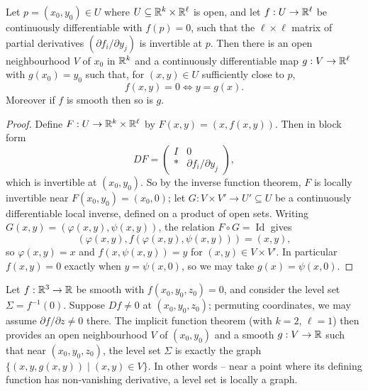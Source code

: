 \documentclass[a4paper]{scrartcl}
\begin{document}
\begin{theorem}
    Let $p = (x_0, y_0) \in U$ where $U \subseteq \mathbb{R}^k \times \mathbb{R}^\ell$ is open, and let $f: U \rightarrow \mathbb{R}^\ell$ be continuously differentiable with $f(p) = 0$, such that the $\ell \times \ell$ matrix of partial derivatives $\left(\partial f_i/\partial y_j\right)$ is invertible at $p$. Then there is an open neighbourhood $V$ of $x_0$ in $\mathbb{R}^k$ and a continuously differentiable map $g: V \rightarrow \mathbb{R}^\ell$ with $g(x_0) = y_0$ such that, for $(x, y) \in U$ sufficiently close to $p$,
    $$
    f(x, y) = 0 \iff y = g(x).
    $$
    Moreover if $f$ is smooth then so is $g$.
\end{theorem}
\begin{proof}
    Define $F: U \rightarrow \mathbb{R}^k \times \mathbb{R}^\ell$ by $F(x, y) = (x, f(x, y))$. Then in block form
    $$
    DF = \begin{pmatrix}
        I & 0 \\ * & \partial f_i/\partial y_j
    \end{pmatrix},
    $$
    which is invertible at $(x_0, y_0)$. So by the inverse function theorem, $F$ is locally invertible near $F(x_0, y_0) = (x_0, 0)$; let $G: V \times V' \rightarrow U' \subseteq U$ be a continuously differentiable local inverse, defined on a product of open sets. Writing $G(x, y) = (\varphi(x, y), \psi(x, y))$, the relation $F \circ G = \operatorname{Id}$ gives
    $$
    (\varphi(x, y), f(\varphi(x,y), \psi(x, y))) = (x, y),
    $$
    so $\varphi(x, y) = x$ and $f(x, \psi(x, y)) = y$ for $(x, y) \in V \times V'$.
    In particular $f(x, y) = 0$ exactly when $y = \psi(x, 0)$, so we may take $g(x) = \psi(x, 0)$.
\end{proof}

\begin{example}
    Let $f: \mathbb{R}^3 \rightarrow \mathbb{R}$ be smooth with $f(x_0, y_0, z_0) = 0$, and consider the level set $\Sigma = f^{-1}(0)$. Suppose $Df \neq 0$ at $(x_0, y_0, z_0)$; permuting coordinates, we may assume $\partial f/\partial z \neq 0$ there. The implicit function theorem (with $k = 2$, $\ell = 1$) then provides an open neighbourhood $V$ of $(x_0, y_0)$ and a smooth $g: V \rightarrow \mathbb{R}$ such that near $(x_0, y_0, z_0)$, the level set $\Sigma$ is exactly the graph $\{(x, y, g(x, y)) \mid (x, y) \in V\}$. In other words -- near a point where its defining function has non-vanishing derivative, a level set is locally a graph.
\end{example}
\end{document}
